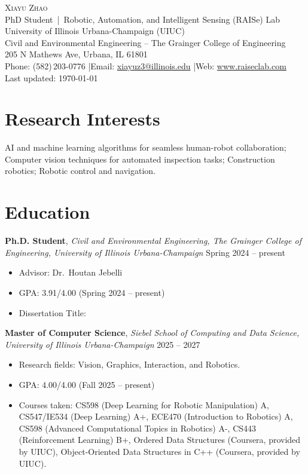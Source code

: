 \documentclass[11pt,a4paper]{article}
\newcommand{\entrytitle}[1]{\textbf{#1}}
\newcommand{\entrydetail}[1]{\textit{#1}}
\begin{document}
\begin{center}
    {\LARGE\textsc{Xiayu Zhao}} \\[6pt]
    PhD Student \,|\, Robotic, Automation, and Intelligent Sensing (RAISe) Lab \\
    University of Illinois Urbana-Champaign (UIUC) \\
    Civil and Environmental Engineering -- The Grainger College of Engineering \\
    205 N Mathews Ave, Urbana, IL 61801 \\[4pt]
    Phone: (582)\,203-0776 \quad|\quad Email: \href{mailto:xiayuz3@illinois.edu}{xiayuz3@illinois.edu} \quad|\quad Web: \href{http://www.raiseclab.com}{www.raiseclab.com}
    \\[4pt]
    {\small Last updated: \today}
\end{center}

\section{Research Interests}

AI and machine learning algorithms for seamless human-robot collaboration; Computer vision techniques for automated inspection tasks; Construction robotics; Robotic control and navigation.

\section{Education}

\entrytitle{Ph.D. Student}, \entrydetail{Civil and Environmental Engineering, The Grainger College of Engineering, University of Illinois Urbana-Champaign} \hfill Spring 2024 -- present \\[-1.5em]
\begin{itemize}[nosep, leftmargin=1.5em]
    \item Advisor: Dr.\ Houtan Jebelli
    \item GPA: 3.91/4.00 (Spring 2024 -- present)
    \item Dissertation Title: 
\end{itemize}

\entrytitle{Master of Computer Science}, \entrydetail{Siebel School of Computing and Data Science, University of Illinois Urbana-Champaign} \hfill 2025 -- 2027 \\[-1.5em]
\begin{itemize}[nosep, leftmargin=1.5em]
    \item Research fields: Vision, Graphics, Interaction, and Robotics.
    \item GPA: 4.00/4.00 (Fall 2025 -- present)
    \item Courses taken: CS598 (Deep Learning for Robotic Manipulation) A, CS547/IE534 (Deep Learning) A+, ECE470 (Introduction to Robotics) A, CS598 (Advanced Computational Topics in Robotics) A-, CS443 (Reinforcement Learning) B+, Ordered Data Structures (Coursera, provided by UIUC), Object-Oriented Data Structures in C++ (Coursera, provided by UIUC).
\end{itemize}
\end{document}
